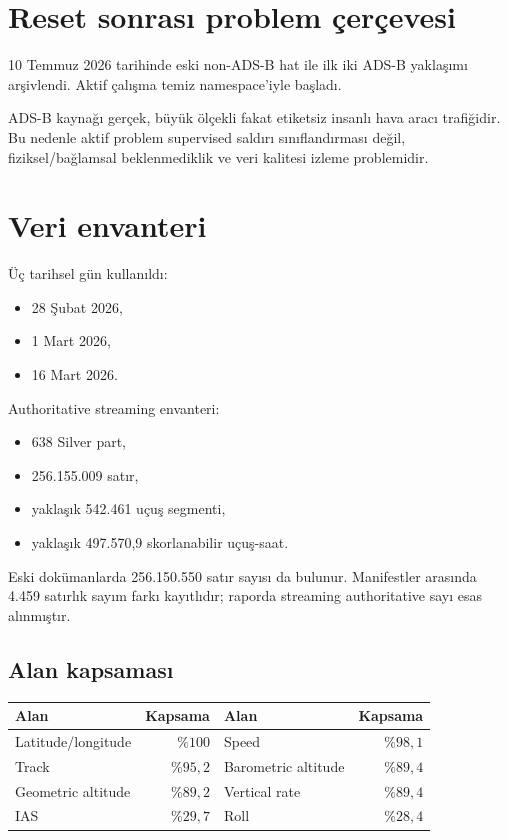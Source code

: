 \documentclass[11pt,a4paper,oneside]{report}
\newcommand{\code}[1]{\texttt{\detokenize{#1}}}
\begin{document}
\section{Reset sonrası problem çerçevesi}

10 Temmuz 2026 tarihinde eski non-ADS-B hat ile ilk iki ADS-B yaklaşımı
arşivlendi. Aktif çalışma temiz \code{adsb/} namespace'iyle başladı.

ADS-B kaynağı gerçek, büyük ölçekli fakat etiketsiz insanlı hava aracı
trafiğidir. Bu nedenle aktif problem supervised saldırı sınıflandırması
değil, fiziksel/bağlamsal beklenmediklik ve veri kalitesi izleme problemidir.

\section{Veri envanteri}

Üç tarihsel gün kullanıldı:

\begin{itemize}
  \item 28 Şubat 2026,
  \item 1 Mart 2026,
  \item 16 Mart 2026.
\end{itemize}

Authoritative streaming envanteri:

\begin{itemize}
  \item 638 Silver part,
  \item 256.155.009 satır,
  \item yaklaşık 542.461 uçuş segmenti,
  \item yaklaşık 497.570,9 skorlanabilir uçuş-saat.
\end{itemize}

Eski dokümanlarda 256.150.550 satır sayısı da bulunur. Manifestler arasında
4.459 satırlık sayım farkı kayıtlıdır; raporda streaming authoritative sayı
esas alınmıştır.

\subsection{Alan kapsaması}

\begin{center}
\begin{tabular}{lr@{\qquad}lr}
\toprule
\textbf{Alan} & \textbf{Kapsama} & \textbf{Alan} & \textbf{Kapsama}\\
\midrule
Latitude/longitude & \(\%100\) & Speed & \(\%98{,}1\)\\
Track & \(\%95{,}2\) & Barometric altitude & \(\%89{,}4\)\\
Geometric altitude & \(\%89{,}2\) & Vertical rate & \(\%89{,}4\)\\
IAS & \(\%29{,}7\) & Roll & \(\%28{,}4\)\\
\bottomrule
\end{tabular}
\end{center}
\end{document}
